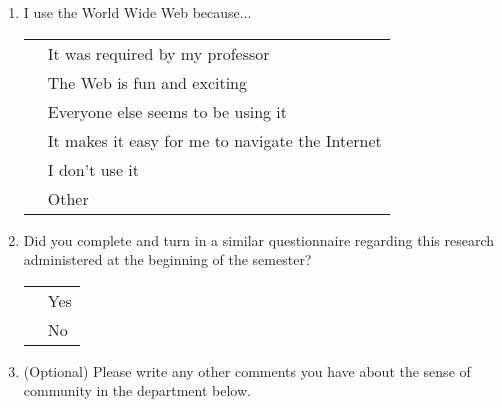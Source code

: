 \begin{enumerate}
\item{I use the World Wide Web because...}\\
  \begin{tabular}{ll}
  \underline{  }\underline{  }\underline{  }  & It was required by my professor\\
  \underline{  }\underline{  }\underline{  }  & The Web is fun and exciting\\
  \underline{  }\underline{  }\underline{  }  & Everyone else seems to be using it\\
  \underline{  }\underline{  }\underline{  }  & It makes it easy for me to
  navigate the Internet\\
  \underline{  }\underline{  }\underline{  }  & I don't use it\\
  \underline{  }\underline{  }\underline{  }  & Other\\
  \end{tabular}

\item{Did you complete and turn in a similar questionnaire regarding this
  research administered at the beginning of the semester?}\\
  \begin{tabular}{ll}
  \underline{  }\underline{  }\underline{  }  & Yes\\
  \underline{  }\underline{  }\underline{  }  & No\\
  \end{tabular}

\item{(Optional) Please write any other comments you have about the sense of
  community in the department below.}
\\ 
\end{enumerate}

